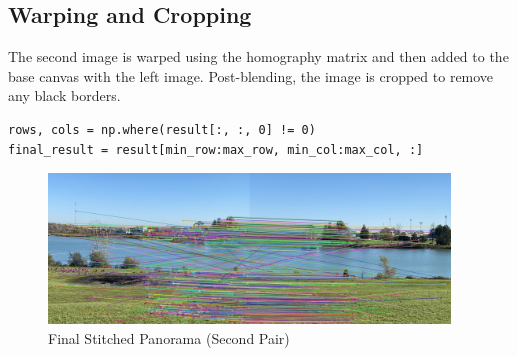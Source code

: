 \documentclass[12pt]{article}
\begin{document}
\subsection{Warping and Cropping}
The second image is warped using the homography matrix and then added to the base canvas with the left image. Post-blending, the image is cropped to remove any black borders.

\begin{verbatim}
rows, cols = np.where(result[:, :, 0] != 0)
final_result = result[min_row:max_row, min_col:max_col, :]
\end{verbatim}

\begin{figure}[H]
    \centering
    \includegraphics[width=0.95\textwidth]{matching1.jpg}
    \caption{Final Stitched Panorama (Second Pair)}
\end{figure}
\end{document}
